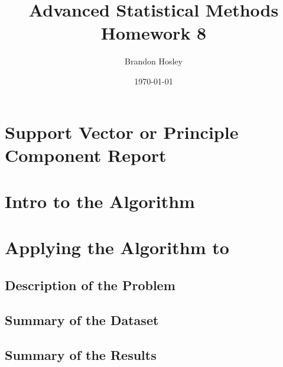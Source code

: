 \documentclass[a4paper,man,natbib]{apa6}
\title{Advanced Statistical Methods Homework 8}
\author{Brandon Hosley}
\date{\today}
\affiliation{University of Illinois - Springfield}
\begin{document}
\maketitle
\singlespacing

\section{Support Vector or Principle Component Report}

\section{Intro to the Algorithm}

\section{Applying the Algorithm to }

\subsection{Description of the Problem}
\subsection{Summary of the Dataset}
\subsection{Summary of the Results}
\end{document}
